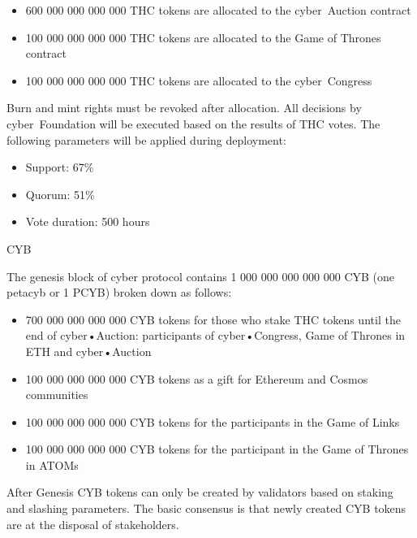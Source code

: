 \documentclass[8pt,oneside]{amsart}
\makeatletter
\renewcommand\subsection{\@startsection{subsection}
                                    {2}{\z@}
                                    {-3.25ex\@plus -1ex \@minus -.2ex}
                                    {0ex \@plus .2ex}
                                    {\play\Large}
                        }
\newcommand{\titleSection}[1]{\subsection{#1}}
\newcommand{\code}[1]{{\PlayBold #1}}
\newenvironment{Figure}
  {\par\medskip\noindent\minipage{\linewidth}}
  {\endminipage\par\medskip}
\makeatother
\begin{document}
\begin{itemize}
\item 600 000 000 000 000 THC tokens are allocated to the cyber~Auction contract
\item 100 000 000 000 000 THC tokens are allocated to the Game of Thrones contract
\item 100 000 000 000 000 THC tokens are allocated to the cyber~Congress
\end{itemize}

\begin{Figure}
 \centering
 
\end{Figure}

Burn and mint rights must be revoked after allocation. All decisions by cyber~Foundation will be executed based on the results of THC votes. The following parameters will be applied during deployment:

\begin{itemize}
\item Support: 67\%
\item Quorum: 51\%
\item Vote duration: 500 hours
\end{itemize}

\titleSection{CYB}\label{CYB}

The genesis block of \code{cyber} protocol contains 1 000 000 000 000 000 CYB (one petacyb or 1 PCYB) broken down as follows:

\begin{itemize}
\item 700 000 000 000 000 CYB tokens for those who stake THC tokens until the end of cyber•Auction: participants of cyber•Congress, Game of Thrones in ETH and cyber•Auction
\item 100 000 000 000 000 CYB tokens as a gift for Ethereum and Cosmos communities
\item 100 000 000 000 000 CYB tokens for the participants in the Game of Links
\item 100 000 000 000 000 CYB tokens for the participant in the Game of Thrones in ATOMs
\end{itemize}

\begin{Figure}
 \centering
 
\end{Figure}

After Genesis CYB tokens can only be created by validators based on staking and slashing parameters. The basic consensus is that newly created CYB tokens are at the disposal of stakeholders.
\end{document}
